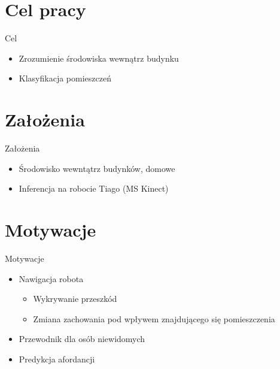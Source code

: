 \documentclass[10pt]{beamer}
\begin{document}
\section[Cel pracy]{Cel pracy}
\begin{frame}{Cel}
 \begin{itemize}
     \item Zrozumienie środowiska wewnątrz budynku
     \item Klasyfikacja pomieszczeń
 \end{itemize}
\end{frame}
\section[Założenia]{Założenia}
\begin{frame}{Założenia}

 \begin{itemize}
     \item Środowisko wewntątrz budynków, domowe
     \item Inferencja na robocie Tiago (MS Kinect)
 \end{itemize}
\end{frame}

\section[Motywacje]{Motywacje}
\begin{frame}{Motywacje}

 \begin{itemize}
     \item Nawigacja robota
     \begin{itemize}
         \item Wykrywanie przeszkód
         \item Zmiana zachowania pod wpływem znajdującego się pomieszczenia
     \end{itemize}
     \item Przewodnik dla osób niewidomych
     \item Predykcja afordancji
 \end{itemize}
\end{frame}
\end{document}
